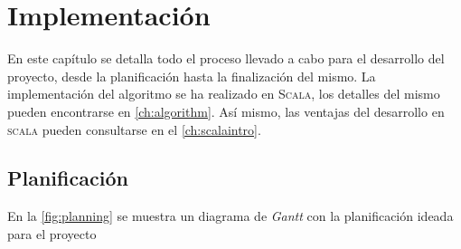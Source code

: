 \chapter{Implementación}
\label{ch:impl}

En este capítulo se detalla todo el proceso llevado a cabo para el desarrollo
del proyecto, desde la planificación hasta la finalización del mismo. La
implementación del algoritmo se ha realizado en \textsc{Scala}, los detalles del
mismo pueden encontrarse en \autoref{ch:algorithm}. Así mismo, las ventajas del
desarrollo en \textsc{scala} pueden consultarse en el \autoref{ch:scalaintro}.

\section{Planificación}
\label{sec:planning}

En la \autoref{fig:planning} se muestra un diagrama de \emph{Gantt} con la
planificación ideada para el proyecto

